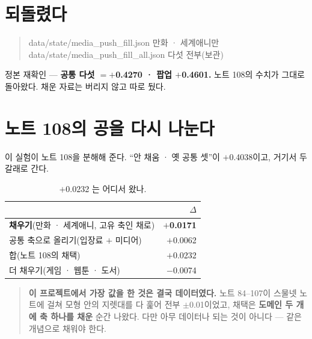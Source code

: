 \documentclass[10pt]{article}
\begin{document}
\section{되돌렸다}

\begin{quote}\fontsize{9.0}{11}\selectfont\ttfamily
data/state/media\_push\_fill.json \quad 만화 · 세계애니만\\
data/state/media\_push\_fill\_all.json \quad 다섯 전부(보관)
\end{quote}

정본 재확인 --- \textbf{공통 다섯 $=+$0.4270 · 팝업 $+$0.4601.} 노트 108의
수치가 그대로 돌아왔다. 채운 자료는 버리지 않고 따로 뒀다.

\section{노트 108의 공을 다시 나눈다}

이 실험이 노트 108을 분해해 준다. ``안 채움 · 옛 공통 셋''이 $+$0.4038이고,
거기서 두 갈래로 간다.

\begin{table}[t]
\centering\tsize
\caption{$+$0.0232 는 어디서 왔나.}
\begin{tabular}{lr}
\toprule
& $\Delta$ \\
\midrule
\textbf{채우기}(만화 · 세계애니, 고유 축인 채로) & \textbf{$+$0.0171} \\
공통 축으로 올리기(입장료 $+$ 미디어) & $+$0.0062 \\
\midrule
합(노트 108의 채택) & $+$0.0232 \\
\midrule
더 채우기(게임 · 웹툰 · 도서) & $-$0.0074 \\
\bottomrule
\end{tabular}
\end{table}


\begin{quote}\fontsize{9.5}{11.5}\selectfont
\textbf{이 프로젝트에서 가장 값을 한 것은 결국 데이터였다.} 노트 84--107이
스물넷 노트에 걸쳐 모형 안의 지렛대를 다 훑어 전부 $\pm$0.01이었고, 채택은
\textbf{도메인 두 개에 축 하나를 채운} 순간 나왔다. 다만 아무 데이터나 되는
것이 아니다 --- 같은 개념으로 채워야 한다.
\end{quote}
\end{document}
